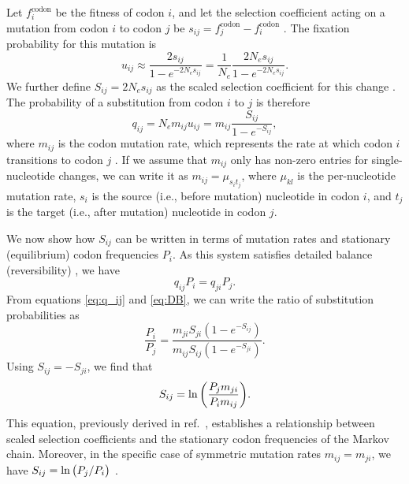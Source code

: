 \documentclass[11pt]{article}
\begin{document}
Let $f^\text{codon}_i$ be the fitness of codon $i$, and let the selection coefficient acting on a mutation from codon $i$ to codon $j$ be $s_{ij} = f^\text{codon}_j - f^\text{codon}_i$ \citep{SellaHirsh2005,YangNielsen2008}. The fixation probability for this mutation is \citep{Kimura1962,HalpernBruno1998,YangNielsen2008}
\begin{equation}\label{eq:u_ij}
u_{ij} \approx \frac{2s_{ij}}{1 - e^{-2N_es_{ij}}} = \frac{1}{N_e}\frac{2N_es_{ij}}{1 - e^{-2N_es_{ij}}} .
\end{equation}
We further define $S_{ij} = 2N_es_{ij}$ as the scaled selection coefficient for this change \citep{YangNielsen2008}. The probability of a substitution from codon $i$ to $j$ is therefore
\begin{equation}\label{eq:q_ij}
q_{ij} = N_em_{ij}u_{ij} = m_{ij}\frac{S_{ij}}{1 - e^{-S_{ij}}} , 
\end{equation} where $m_{ij}$ is the codon mutation rate, which represents the rate at which codon $i$ transitions to codon $j$  \citep{HalpernBruno1998,SellaHirsh2005}. If we assume that $m_{ij}$ only has non-zero entries for  single-nucleotide changes, we can write it as $m_{ij}=\mu_{s_it_j}$, where $\mu_{kl}$ is the per-nucleotide mutation rate, $s_i$ is the source (i.e., before mutation) nucleotide in codon $i$, and $t_j$ is the target (i.e., after mutation) nucleotide in codon $j$.

We now show how $S_{ij}$ can be written in terms of mutation rates and stationary (equilibrium) codon frequencies $P_i$. As this system satisfies detailed balance (reversibility) \citep{HalpernBruno1998}, we have 
\begin{equation}\label{eq:DB}
q_{ij}P_i = q_{ji}P_j .
\end{equation} From equations \eqref{eq:q_ij} and \eqref{eq:DB}, we can write the ratio of substitution probabilities as 
\begin{equation}\label{ratio_q_ij}
\frac{P_i}{P_j} = \frac{m_{ji} S_{ji} (1-e^{-S_{ij}})} {m_{ij} S_{ij} (1-e^{-S_{ji}})} .
\end{equation} Using $S_{ij} = -S_{ji}$, we find that
\begin{equation}\label{eq:s_pmu}
S_{ij} = \ln\bigg{(} \frac{P_jm_{ji}}{P_im_{ij}} \bigg{)} .
\end{equation} This equation, previously derived in ref.\ \citep{HalpernBruno1998}, establishes a relationship between scaled selection coefficients and the stationary codon frequencies of the Markov chain. Moreover, in the specific case of symmetric mutation rates $m_{ij} = m_{ji}$, we have $S_{ij} = \ln\big{(}P_j/P_i\big{)}$ \citep{SellaHirsh2005}. 
\end{document}
